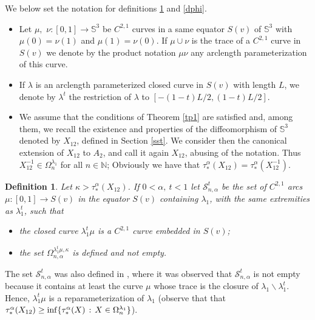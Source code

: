 \documentclass{article}
\def\S3{{\mathbb S^3}}
\newtheorem{definition}{Definition}[section]
\begin{document}
We below set the notation for definitions \ref{dl} and \ref{dphi}.

\begin{itemize}\label{prod}
\item Let $\mu,$ $\nu: [0,1]\to\S3$ be $C^{2,1}$ curves in a same equator $S(v)$ of $\S3$ with $\mu(0)=\nu(1)$ and $\mu(1)=\nu(0)$. If $\mu\cup\nu$ is the trace of a $C^{2,1}$ curve in $S(v)$ we denote by the product notation $\mu\nu$ any arclength parameterization of this curve.
\item If $\lambda$ is an  arclength parameterized closed curve in $S(v)$ with length $L$,  we denote by $\lambda^t$ the restriction of $\lambda$ to $[-(1-t)L/2 ,(1-t)L/2]$.
\item We assume that the conditions of Theorem \ref{tp1} are satisfied and, among them, we recall the existence and properties of the diffeomorphism of $\S3$ denoted by $X_{12}$, defined in Section \ref{sst}. We consider then the canonical extension of $X_{12}$ to $A_2$, and call it again $X_{12}$, abusing of the notation. Thus $X_{12}^{-1}\in \Omega_{n}^{\lambda_1}$ for all $n\in \mathbb N$; Obviously we have that $\tau_*^\alpha(X_{12})=\tau_*^\alpha(X_{12}^{-1})$. 
\end{itemize}


\begin{definition}\label{dl}  Let $\kappa >\tau_*^\alpha(X_{12})$. If $0<\alpha,\ t<1$ let
 $\mathcal{S}_{n,\alpha}^t$ be the set of $C^{2,1}$ arcs $\mu:[0,1]\to S(v)$ in the equator $S(v)$ containing $\lambda_1$, with the same extremities as $\lambda^t_1$, such that 
\begin{itemize}
\item[(1)] the closed curve $\lambda_1^t\mu$ is a $C^{2,1}$ curve embedded in $S(v)$; 
\item[(2)] the set $\Omega^{\lambda^t_1\mu,\kappa}_{n,\alpha}$ is defined and not empty.
\end{itemize}
\end{definition}


 The set $\mathcal{S}_{n,\alpha}^t$ was also defined in \cite{p1}, where it was observed that $\mathcal{S}_{n,\alpha}^t$ is not empty because it contains at least the curve $\mu$ whose trace is the closure of
$\lambda_1\backslash \lambda^t_1$. Hence, $\lambda_1^t\mu$ is a reparameterization of $\lambda_1$  (observe that
that $\tau_*^\alpha(X_{12})\geq \inf \{\tau_*^\alpha(X)\hspace{.02in}:\hspace{.02in} X\in\Omega_{n}^{\lambda_1}\}$).
\end{document}
